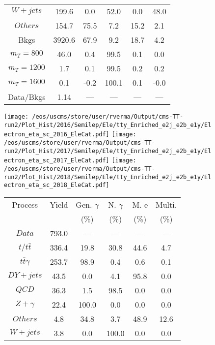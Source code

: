 \begin{figure}
\begin{minipage}[c]{0.32\textwidth}
{\begin{tabular}{cccccc}
$ W+jets $ &  199.6 &  0.0 &  52.0 &  0.0 &  48.0\\
$ Others $ &  154.7 &  75.5 &  7.2 &  15.2 &  2.1\\
Bkgs &  3920.6 &  67.9 &  9.2 &  18.7 &  4.2\\
$ m_{T} = 800 $ &  46.0 &  0.4 &  99.5 &  0.1 &  0.0\\
$ m_{T} = 1200 $ &  1.7 &  0.1 &  99.5 &  0.2 &  0.2\\
$ m_{T} = 1600 $ &  0.1 &  -0.2 &  100.1 &  0.1 &  -0.0\\
Data/Bkgs &  1.14 &  --- &  --- &  --- &  ---\\
\hline
\end{tabular}
}
\end{minipage}
\end{figure}

\begin{figure}
\centering
\texttt{[image: /eos/uscms/store/user/rverma/Output/cms-TT-run2/Plot\_Hist/2016/Semilep/Ele/tty\_Enriched\_e2j\_e2b\_e1y/Electron\_eta\_sc\_2016\_EleCat.pdf]}
\texttt{[image: /eos/uscms/store/user/rverma/Output/cms-TT-run2/Plot\_Hist/2017/Semilep/Ele/tty\_Enriched\_e2j\_e2b\_e1y/Electron\_eta\_sc\_2017\_EleCat.pdf]}
\texttt{[image: /eos/uscms/store/user/rverma/Output/cms-TT-run2/Plot\_Hist/2018/Semilep/Ele/tty\_Enriched\_e2j\_e2b\_e1y/Electron\_eta\_sc\_2018\_EleCat.pdf]}
\begin{minipage}[c]{0.32\textwidth}
\centering
\tiny{
\begin{tabular}{cccccc}
\hline
Process & Yield & Gen. $\gamma$ & N. $\gamma$ & M. e & Multi. \\
 &  & (\%) & (\%) & (\%) & (\%)  \\
\hline
                                                                      $ Data $ &  793.0 &  --- &  --- &  --- &  ---\\
$ t/t\bar{t} $ &  336.4 &  19.8 &  30.8 &  44.6 &  4.7\\
$ t\bar{t}\gamma $ &  253.7 &  98.9 &  0.4 &  0.6 &  0.1\\
$ DY+jets $ &  43.5 &  0.0 &  4.1 &  95.8 &  0.0\\
$ QCD $ &  36.3 &  1.5 &  98.5 &  0.0 &  0.0\\
$ Z+\gamma $ &  22.4 &  100.0 &  0.0 &  0.0 &  0.0\\
$ Others $ &  4.8 &  34.8 &  3.7 &  48.9 &  12.6\\
$ W+jets $ &  3.8 &  0.0 &  100.0 &  0.0 &  0.0\\

\end{tabular}}
\end{minipage}
\end{figure}
